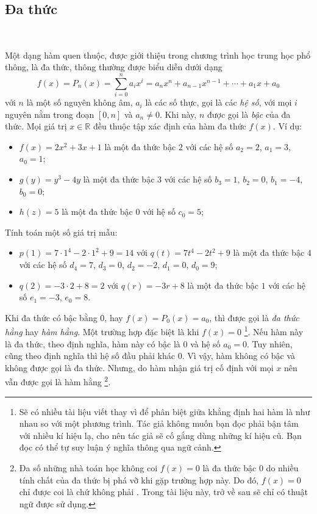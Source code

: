 \subsection{Đa thức}

\ %

Một dạng hàm quen thuộc, được giới thiệu trong chương trình học trung học phổ thông, là đa thức, thông thường được biểu diễn dưới dạng $$f(x)=P_n(x)=\sum_{i = 0}^n a_i x^i = a_nx^n + a_{n-1}x^{n-1} + \cdots + a_1x + a_0$$ với $n$ là một số nguyên không âm, $a_i$ là các số thực, gọi là các \emph{hệ số}, với mọi $i$ nguyên nằm trong đoạn $[0, n]$ và $a_n \neq 0$. Khi này, $n$ được gọi là \emph{bậc} của đa thức. Mọi giá trị $x \in \mathbb{R}$ đều thuộc tập xác định của hàm đa thức $f(x)$. Ví dụ:
\begin{itemize}
   \item $f(x) = 2x^2 + 3x + 1$ là một đa thức bậc $2$ với các hệ số $a_2 = 2$, $a_1 = 3$, $a_0 = 1$;
   \item $g(y) = y^3 - 4y$ là một đa thức bậc $3$ với các hệ số $b_3 = 1$, $b_2 = 0$, $b_1 = -4$, $b_0 = 0$;
   \item $h(z) = 5$ là một đa thức bậc $0$ với hệ số $c_0 = 5$;
\end{itemize}
Tính toán một số giá trị mẫu:
\begin{itemize}
   \item $p(1) = 7 \cdot 1^4 - 2 \cdot 1^2 + 9 = 14$ với $q(t)= 7t^4 - 2t^2 + 9$ là một đa thức bậc $4$ với các hệ số $d_4 = 7$, $d_3 = 0$, $d_2 = -2$, $d_1 = 0$, $d_0 = 9$;
   \item $q(2) = -3 \cdot 2 + 8 = 2$ với $q(r) = -3r + 8$ là một đa thức bậc $1$ với các hệ số $e_1 = -3$, $e_0 = 8$.
\end{itemize}
Khi đa thức có bậc bằng $0$, hay $f(x) = P_0(x) = a_0$, thì được gọi là \emph{đa thức hằng} hay \emph{hàm hằng}. Một trường hợp đặc biệt là khi $f(x) = 0$ \footnote{Sẽ có nhiều tài liệu viết  thay vì  để phân biệt giữa khẳng định hai hàm là như nhau so với một phương trình. Tác giả không muốn bạn đọc phải bận tâm với nhiều kí hiệu lạ, cho nên tác giả sẽ cố gắng dùng những kí hiệu cũ. Bạn đọc có thể tự suy luận ý nghĩa thông qua ngữ cảnh.}. Nếu hàm này là đa thức, theo định nghĩa, hàm này có bậc là $0$ và hệ số $a_0 = 0$. Tuy nhiên, cũng theo định nghĩa thì hệ số đầu phải khác $0$. Vì vậy, hàm không có bậc và không được gọi là đa thức. Nhưng, do hàm nhận giá trị cố định với mọi $x$ nên vẫn được gọi là hàm hằng \footnote{Đa số những nhà toán học không coi $f(x) = 0$ là đa thức bậc $0$ do nhiều tính chất của đa thức bị phá vỡ khi gặp trường hợp này. Do đó, $f(x) = 0$ chỉ được coi là  chứ không phải . Trong tài liệu này, trở về sau sẽ chỉ có thuật ngữ  được sử dụng.}.

